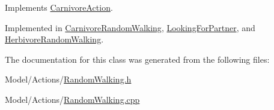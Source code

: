 Implements \hyperlink{class_carnivore_action_a2c955f0de63b624b23d15e913060bf2a}{Carnivore\+Action}.



Implemented in \hyperlink{class_carnivore_random_walking_ae34e8070f9ac8826bb08141c43adcaf5}{Carnivore\+Random\+Walking}, \hyperlink{class_looking_for_partner_a83ef295e8ae6ff29521e0225683bf0af}{Looking\+For\+Partner}, and \hyperlink{class_herbivore_random_walking_a27a17f1ee3d5df3103f3348523c4801a}{Herbivore\+Random\+Walking}.



The documentation for this class was generated from the following files\+:\begin{DoxyCompactItemize}
\item 
Model/\+Actions/\hyperlink{_random_walking_8h}{Random\+Walking.\+h}\item 
Model/\+Actions/\hyperlink{_random_walking_8cpp}{Random\+Walking.\+cpp}\end{DoxyCompactItemize}

